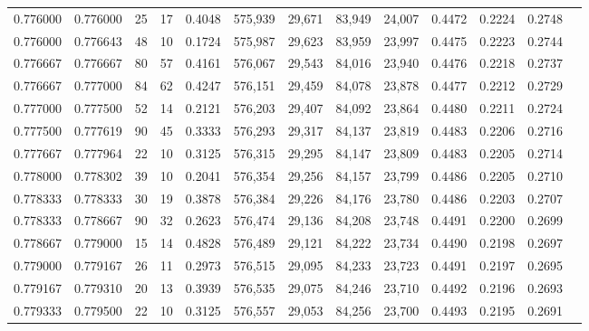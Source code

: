 \begin{tabular}{rrrrrrrrrrrrr}
0.776000 & 0.776000 &    25 &  17 &                                     0.4048 & 575,939 &  29,671 &  83,949 &  24,007 & 0.4472 & 0.2224 & 0.2748 \\
0.776000 & 0.776643 &    48 &  10 &                                     0.1724 & 575,987 &  29,623 &  83,959 &  23,997 & 0.4475 & 0.2223 & 0.2744 \\
0.776667 & 0.776667 &    80 &  57 &                                     0.4161 & 576,067 &  29,543 &  84,016 &  23,940 & 0.4476 & 0.2218 & 0.2737 \\
0.776667 & 0.777000 &    84 &  62 &                                     0.4247 & 576,151 &  29,459 &  84,078 &  23,878 & 0.4477 & 0.2212 & 0.2729 \\
0.777000 & 0.777500 &    52 &  14 &                                     0.2121 & 576,203 &  29,407 &  84,092 &  23,864 & 0.4480 & 0.2211 & 0.2724 \\
0.777500 & 0.777619 &    90 &  45 &                                     0.3333 & 576,293 &  29,317 &  84,137 &  23,819 & 0.4483 & 0.2206 & 0.2716 \\
0.777667 & 0.777964 &    22 &  10 &                                     0.3125 & 576,315 &  29,295 &  84,147 &  23,809 & 0.4483 & 0.2205 & 0.2714 \\
0.778000 & 0.778302 &    39 &  10 &                                     0.2041 & 576,354 &  29,256 &  84,157 &  23,799 & 0.4486 & 0.2205 & 0.2710 \\
0.778333 & 0.778333 &    30 &  19 &                                     0.3878 & 576,384 &  29,226 &  84,176 &  23,780 & 0.4486 & 0.2203 & 0.2707 \\
0.778333 & 0.778667 &    90 &  32 &                                     0.2623 & 576,474 &  29,136 &  84,208 &  23,748 & 0.4491 & 0.2200 & 0.2699 \\
0.778667 & 0.779000 &    15 &  14 &                                     0.4828 & 576,489 &  29,121 &  84,222 &  23,734 & 0.4490 & 0.2198 & 0.2697 \\
0.779000 & 0.779167 &    26 &  11 &                                     0.2973 & 576,515 &  29,095 &  84,233 &  23,723 & 0.4491 & 0.2197 & 0.2695 \\
0.779167 & 0.779310 &    20 &  13 &                                     0.3939 & 576,535 &  29,075 &  84,246 &  23,710 & 0.4492 & 0.2196 & 0.2693 \\
0.779333 & 0.779500 &    22 &  10 &                                     0.3125 & 576,557 &  29,053 &  84,256 &  23,700 & 0.4493 & 0.2195 & 0.2691 \\

\end{tabular}
